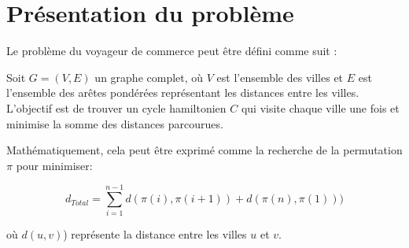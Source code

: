\section{Présentation du problème}

Le problème du voyageur de commerce \cite{wiki-tsp} peut être défini comme suit :

Soit $G=(V,E)$ un graphe complet, où $V$ est l'ensemble des villes et $E$ est l'ensemble des arêtes pondérées représentant les distances entre les villes. L'objectif est de trouver un cycle hamiltonien $C$ qui visite chaque ville une fois et minimise la somme des distances parcourues.
\newline

Mathématiquement, cela peut être exprimé comme la recherche de la permutation $\pi$ pour minimiser:

$$ d_{Total} = \sum_{i=1}^{n-1}d(\pi(i),\pi(i+1))+d(\pi(n),\pi(1)))$$

où $d(u,v)$) représente la distance entre les villes $u$ et $v$.
